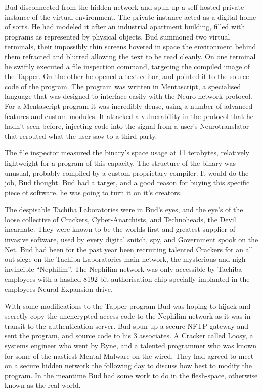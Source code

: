 \documentclass{book}
\begin{document}
Bud disconnected from the hidden network and spun up a self hosted private instance of the virtual environment. The private instance acted as a digital home of sorts. He had modeled it after an industrial apartment building, filled with programs as represented by physical objects. Bud summoned two virtual terminals, their impossibly thin screens hovered in space the environment behind them refracted and blurred allowing the text to be read cleanly. On one terminal he swiftly executed a file inspection command, targeting the compiled image of the Tapper. On the other he opened a text editor, and pointed it to the source code of the program. The program was written in Mentascript, a specialised language that was designed to interface easily with the Neuro-network protocol. For a Mentascript program it was incredibly dense, using a number of advanced features and custom modules. It attacked a vulnerability in the protocol that he hadn't seen before, injecting code into the signal from a user's Neurotranslator that rerouted what the user saw to a third party.

The file inspector measured the binary's space usage at 11 terabytes, relatively lightweight for a program of this capacity. The structure of the binary was unusual, probably compiled by a custom proprietary compiler. It would do the job, Bud thought. Bud had a target, and a good reason for buying this specific piece of software, he was going to turn it on it's creators.

The despisable Tachiba Laboratories were in Bud's eyes, and the eye's of the loose collective of Crackers, Cyber-Anarchists, and Technoheads, the Devil incarnate. They were known to be the worlds first and greatest supplier of invasive software, used by every digital snitch, spy, and Government spook on the Net. Bud had been for the past year been recruiting talented Crackers for an all out siege on the Tachiba Laboratories main network, the mysterious and nigh invincible ``Nephilim''. The Nephilim network was only accessible by Tachiba employees with a hashed 8192 bit authorisation chip specially implanted in the employees Neural-Expansion drive.

With some modifications to the Tapper program Bud was hoping to hijack and secretly copy the unencrypted access code to the Nephilim network as it was in transit to the authentication server. Bud spun up a secure NFTP gateway and sent the program, and source code to his 3 associates. A Cracker called Loosy, a systems engineer who went by Ryne, and a talented programmer who was known for some of the nastiest Mental-Malware on the wired. They had agreed to meet on a secure hidden network the following day to discuss how best to modify the program. In the meantime Bud had some work to do in the flesh-space, otherwise known as the real world.
\end{document}

